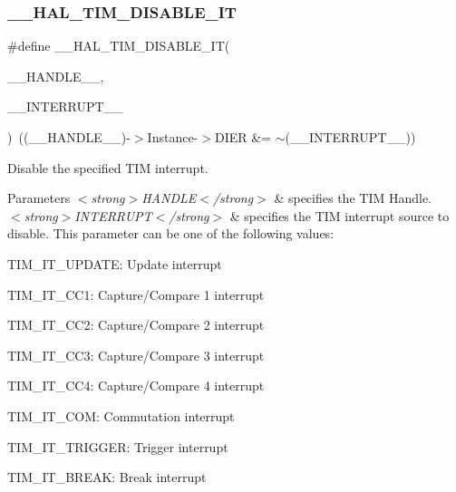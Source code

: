 \subsubsection{\texorpdfstring{\+\_\+\+\_\+\+H\+A\+L\+\_\+\+T\+I\+M\+\_\+\+D\+I\+S\+A\+B\+L\+E\+\_\+\+IT}{\_\_HAL\_TIM\_DISABLE\_IT}}
{\footnotesize\ttfamily \#define \+\_\+\+\_\+\+H\+A\+L\+\_\+\+T\+I\+M\+\_\+\+D\+I\+S\+A\+B\+L\+E\+\_\+\+IT(\begin{DoxyParamCaption}\item[{}]{\+\_\+\+\_\+\+H\+A\+N\+D\+L\+E\+\_\+\+\_\+,  }\item[{}]{\+\_\+\+\_\+\+I\+N\+T\+E\+R\+R\+U\+P\+T\+\_\+\+\_\+ }\end{DoxyParamCaption})~((\+\_\+\+\_\+\+H\+A\+N\+D\+L\+E\+\_\+\+\_\+)-\/$>$Instance-\/$>$D\+I\+ER \&= $\sim$(\+\_\+\+\_\+\+I\+N\+T\+E\+R\+R\+U\+P\+T\+\_\+\+\_\+))}



Disable the specified T\+IM interrupt. 


\begin{DoxyParams}{Parameters}
{\em $<$strong$>$\+H\+A\+N\+D\+L\+E$<$/strong$>$} & specifies the T\+IM Handle. \\
\hline
{\em $<$strong$>$\+I\+N\+T\+E\+R\+R\+U\+P\+T$<$/strong$>$} & specifies the T\+IM interrupt source to disable. This parameter can be one of the following values\+: \begin{DoxyItemize}
\item T\+I\+M\+\_\+\+I\+T\+\_\+\+U\+P\+D\+A\+TE\+: Update interrupt \item T\+I\+M\+\_\+\+I\+T\+\_\+\+C\+C1\+: Capture/\+Compare 1 interrupt \item T\+I\+M\+\_\+\+I\+T\+\_\+\+C\+C2\+: Capture/\+Compare 2 interrupt \item T\+I\+M\+\_\+\+I\+T\+\_\+\+C\+C3\+: Capture/\+Compare 3 interrupt \item T\+I\+M\+\_\+\+I\+T\+\_\+\+C\+C4\+: Capture/\+Compare 4 interrupt \item T\+I\+M\+\_\+\+I\+T\+\_\+\+C\+OM\+: Commutation interrupt \item T\+I\+M\+\_\+\+I\+T\+\_\+\+T\+R\+I\+G\+G\+ER\+: Trigger interrupt \item T\+I\+M\+\_\+\+I\+T\+\_\+\+B\+R\+E\+AK\+: Break interrupt \end{DoxyItemize}
\\
\hline
\end{DoxyParams}

